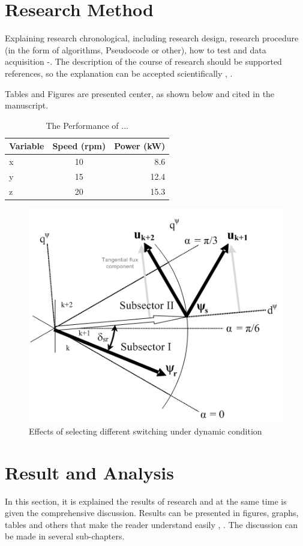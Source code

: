 \documentclass{iaesarticle3}
\begin{document}
\section{Research Method}
\label{}
Explaining research chronological, including research design, research procedure (in the form of algorithms, Pseudocode or other), how to test and data acquisition \cite{Li}-\cite{Zhang}. The description of the course of research should be supported references, so the explanation can be accepted scientifically \cite{Arulmozhiyal}, \cite{Yinhai}.
\par
Tables and Figures are presented center, as shown below and cited in the manuscript.\\

\begin{table}[h]
\caption{The Performance of ...}
\centering
\begin{tabular}{lcr}
\hline
Variable & Speed (rpm) & Power (kW) \\
\hline
x & 10 & 8.6 \\
y & 15 & 12.4 \\
z & 20 & 15.3 \\
\hline
\end{tabular}
\end{table}

\begin{figure}[h]
\centering
\includegraphics[scale=0.5]{figure1}
\caption{Effects of selecting different switching under dynamic condition}
\end{figure}

\section{Result and Analysis}
\label{}
In this section, it is explained the results of research and at the same time is given the comprehensive discussion. Results can be presented in figures, graphs, tables and others that make the reader understand easily \cite{Arulmozhiyal}, \cite{lamport}. The discussion can be made in several sub-chapters.
\end{document}
